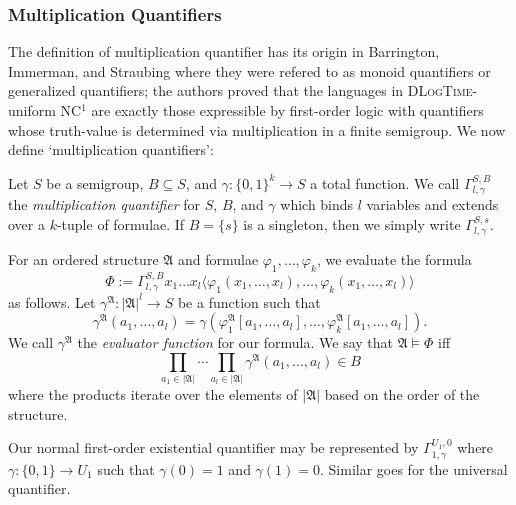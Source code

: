 \documentclass[a4paper,UKenglish,cleveref, autoref, thm-restate, anonymous]{lipics-v2021}
\begin{document}
\subsubsection{Multiplication Quantifiers}\label{sec:backgroundmult}

The definition of multiplication quantifier has its origin in Barrington, Immerman, and Straubing \cite[Section 5]{barrington1990uniformity} where they were refered to as monoid quantifiers or generalized quantifiers; the authors proved that the languages in \textsc{DLogTime}-uniform NC${}^1$ are exactly those expressible by first-order logic with quantifiers whose truth-value is determined via multiplication in a finite semigroup. We now define `multiplication quantifiers':

\begin{definition}\label{def:multquant}
    Let $S$ be a semigroup, $B \subseteq S$, and $\gamma : \{0,1\}^k \rightarrow S$ a total function. We call $\Gamma_{l,\gamma}^{S,B}$ the \emph{multiplication quantifier} for $S$, $B$, and $\gamma$ which binds $l$ variables and extends over a $k$-tuple of formulae. If $B = \{s\}$ is a singleton, then we simply write $\Gamma_{l,\gamma}^{S,s}$.
    
    For an ordered structure $\mathfrak{A}$ and formulae $\varphi_1, \dots, \varphi_k$, we evaluate the formula \[
        \Phi := \Gamma_{l,\gamma}^{S,B}x_1\dots x_l\langle \varphi_1(x_1,\dots,x_l), \dots, \varphi_k(x_1,\dots,x_l)\rangle
    \] as follows. Let $\gamma^\mathfrak{A} : |\mathfrak{A}|^l \rightarrow S$ be a function such that \[
        \gamma^\mathfrak{A}(a_1,\dots,a_l) = \gamma(\varphi_1^\mathfrak{A}[a_1,\dots,a_l], \dots, \varphi_k^\mathfrak{A}[a_1,\dots,a_l]).
    \] We call $\gamma^\mathfrak{A}$ the \emph{evaluator function} for our formula. We say that \(\mathfrak{A} \models \Phi\) iff \[
        \prod_{a_1 \in |\mathfrak{A}|}\cdots\prod_{a_l \in |\mathfrak{A}|}\gamma^\mathfrak{A}(a_1,\dots,a_l) \in B
    \] where the products iterate over the elements of $|\mathfrak{A}|$ based on the order of the structure.
\end{definition}

\begin{example}
    Our normal first-order existential quantifier may be represented by $\Gamma^{U_1,0}_{1,\gamma}$ where $\gamma : \{0,1\} \rightarrow U_1$ such that $\gamma(0) = 1$ and $\gamma(1) = 0$. Similar goes for the universal quantifier.
\end{example}
\end{document}
